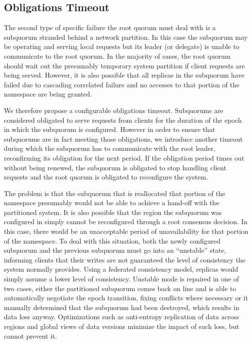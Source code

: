 \subsection{Obligations Timeout}
\label{ch03_obligations_timeout}

The second type of specific failure the root quorum must deal with is a subquorum stranded behind a network partition.
In this case the subquorum may be operating and serving local requests but its leader (or delegate) is unable to communicate to the root quorum.
In the majority of cases, the root quorum should wait out the presumably temporary system partition if client requests are being served.
However, it is also possible that all replicas in the subquorum have failed due to cascading correlated failure and no accesses to that portion of the namespace are being granted.

We therefore propose a configurable obligations timeout.
Subquorums are considered obligated to serve requests from clients for the duration of the epoch in which the subquorum is configured.
However in order to ensure that subquorums are in fact meeting those obligations, we introduce another timeout during which the subquorum has to communicate with the root leader, reconfirming its obligation for the next period.
If the obligation period times out without being renewed, the subquorum is obligated to stop handling client requests and the root quorum is obligated to reconfigure the system.

The problem is that the subquorum that is reallocated that portion of the namespace presumably would not be able to achieve a hand-off with the partitioned system.
It is also possible that the region the subquorum was configured in simply cannot be reconfigured through a root consensus decision.
In this case, there would be an unacceptable period of unavailability for that portion of the namespace.
To deal with this situation, both the newly configured subquorum and the previous subquorum must go into an ``unstable'' state, informing clients that their writes are not guaranteed the level of consistency the system normally provides.
Using a federated consistency model, replicas would simply assume a lower level of consistency.
Unstable mode is repaired in one of two cases, either the partitioned subquorum comes back on line and is able to automatically negotiate the epoch transition, fixing conflicts where necessary or it manually determined that the subquorum had been destroyed, which results in data loss anyway.
Optimizations such as anti-entropy replication of data across regions and global views of data versions minimize the impact of such loss, but cannot prevent it.

